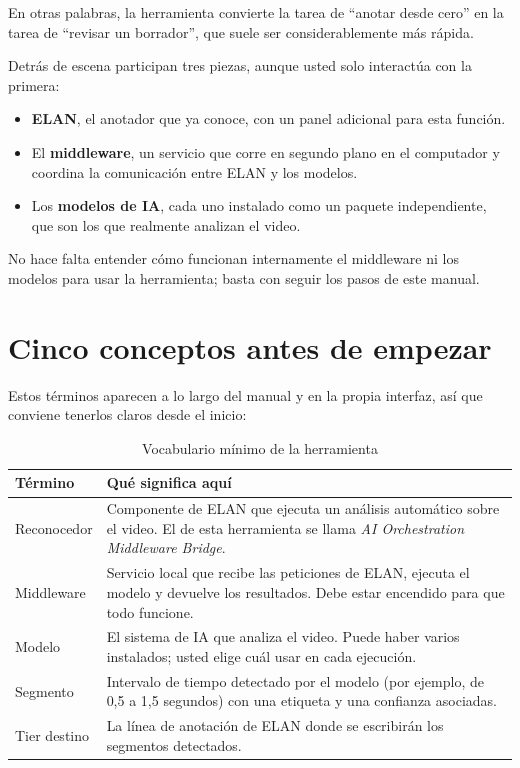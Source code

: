 \documentclass[12pt,a4paper]{article}
\begin{document}
En otras palabras, la herramienta convierte la tarea de ``anotar desde cero'' en la tarea de ``revisar un borrador'', que suele ser considerablemente más rápida.

Detrás de escena participan tres piezas, aunque usted solo interactúa con la primera:

\begin{itemize}[noitemsep, topsep=2pt]
    \item \textbf{ELAN}, el anotador que ya conoce, con un panel adicional para esta función.
    \item El \textbf{middleware}, un servicio que corre en segundo plano en el computador y coordina la comunicación entre ELAN y los modelos.
    \item Los \textbf{modelos de IA}, cada uno instalado como un paquete independiente, que son los que realmente analizan el video.
\end{itemize}

No hace falta entender cómo funcionan internamente el middleware ni los modelos para usar la herramienta; basta con seguir los pasos de este manual.

\section{Cinco conceptos antes de empezar}

Estos términos aparecen a lo largo del manual y en la propia interfaz, así que conviene tenerlos claros desde el inicio:

\begin{table}[H]
\centering
\caption{Vocabulario mínimo de la herramienta}
\small
\begin{tabular}{
    >{\raggedright\arraybackslash}p{3.4cm}
    >{\raggedright\arraybackslash}p{11.0cm}
}
\toprule
\textbf{Término} & \textbf{Qué significa aquí} \\
\midrule
Reconocedor & Componente de ELAN que ejecuta un análisis automático sobre el video. El de esta herramienta se llama \textit{AI Orchestration Middleware Bridge}. \\
Middleware & Servicio local que recibe las peticiones de ELAN, ejecuta el modelo y devuelve los resultados. Debe estar encendido para que todo funcione. \\
Modelo & El sistema de IA que analiza el video. Puede haber varios instalados; usted elige cuál usar en cada ejecución. \\
Segmento & Intervalo de tiempo detectado por el modelo (por ejemplo, de 0,5 a 1,5 segundos) con una etiqueta y una confianza asociadas. \\
Tier destino & La línea de anotación de ELAN donde se escribirán los segmentos detectados. \\
\bottomrule
\end{tabular}
\end{table}
\end{document}
